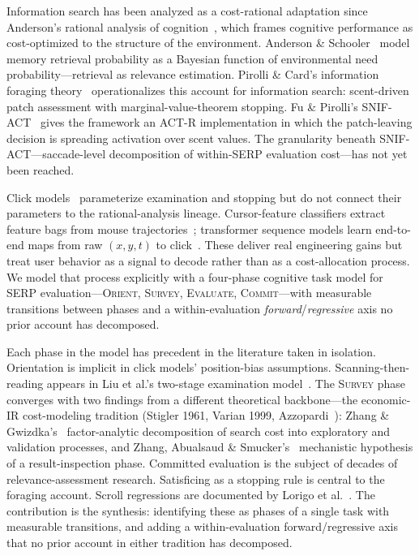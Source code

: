 \documentclass[10pt,twocolumn,letterpaper]{article}
\begin{document}
Information search has been analyzed as a cost-rational adaptation since Anderson's rational analysis of cognition~\cite{anderson1990adaptive}, which frames cognitive performance as cost-optimized to the structure of the environment. Anderson \& Schooler~\cite{anderson1991reflections} model memory retrieval probability as a Bayesian function of environmental need probability---retrieval as relevance estimation. Pirolli \& Card's information foraging theory~\cite{pirolli1999foraging} operationalizes this account for information search: scent-driven patch assessment with marginal-value-theorem stopping. Fu \& Pirolli's SNIF-ACT~\cite{fu2007snifact} gives the framework an ACT-R implementation in which the patch-leaving decision is spreading activation over scent values. The granularity beneath SNIF-ACT---saccade-level decomposition of within-SERP evaluation cost---has not yet been reached.

Click models~\cite{craswell2008positionbias,chapelle2009dbn,dupret2008ubm,chuklin2015clickmodels} parameterize examination and stopping but do not connect their parameters to the rational-analysis lineage. Cursor-feature classifiers extract feature bags from mouse trajectories~\cite{arapakis2016engagement}; transformer sequence models learn end-to-end maps from raw $(x, y, t)$ to click~\cite{villaizan2025adsight,bruckner2021systematic}. These deliver real engineering gains but treat user behavior as a signal to decode rather than as a cost-allocation process. We model that process explicitly with a four-phase cognitive task model for SERP evaluation---\textsc{Orient}, \textsc{Survey}, \textsc{Evaluate}, \textsc{Commit}---with measurable transitions between phases and a within-evaluation \emph{forward}/\emph{regressive} axis no prior account has decomposed.

Each phase in the model has precedent in the literature taken in isolation. Orientation is implicit in click models' position-bias assumptions. Scanning-then-reading appears in Liu et al.'s two-stage examination model~\cite{liu2014skimming}. The \textsc{Survey} phase converges with two findings from a different theoretical backbone---the economic-IR cost-modeling tradition (Stigler 1961, Varian 1999, Azzopardi~\cite{azzopardi2011economics,azzopardi2014modelling}): Zhang \& Gwizdka's~\cite{zhang2016rethinking} factor-analytic decomposition of search cost into exploratory and validation processes, and Zhang, Abualsaud \& Smucker's~\cite{zhang2018requery} mechanistic hypothesis of a result-inspection phase. Committed evaluation is the subject of decades of relevance-assessment research. Satisficing as a stopping rule is central to the foraging account. Scroll regressions are documented by Lorigo et al.~\cite{lorigo2008eyetracking}. The contribution is the synthesis: identifying these as phases of a single task with measurable transitions, and adding a within-evaluation forward/regressive axis that no prior account in either tradition has decomposed.
\end{document}
